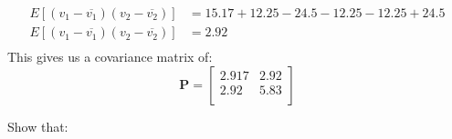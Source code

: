\documentclass[12pt,letterpaper, onecolumn]{exam}
\begin{document}
\begin{questions}
\begin{parts}
\begin{equation}
\begin{split}
		                E\left[(v_1 - \overline{v_1})(v_2 - \overline{v_2}) \right] & = 15.17 + 12.25 - 24.5 - 12.25 - 12.25 + 24.5\\
		                E\left[(v_1 - \overline{v_1})(v_2 - \overline{v_2}) \right] & = 2.92\\
		            \end{split}
		        \end{equation}
		        This gives us a covariance matrix of:
		        \begin{equation}
		            \mathbf{P} =
		            \begin{bmatrix}
		                2.917 & 2.92 \\
		                2.92  & 5.83 \\
		            \end{bmatrix}
		        \end{equation}
    \end{parts}
    \clearpage
     Show that:
    \begin{parts}

\end{parts}
\end{questions}
\end{document}

